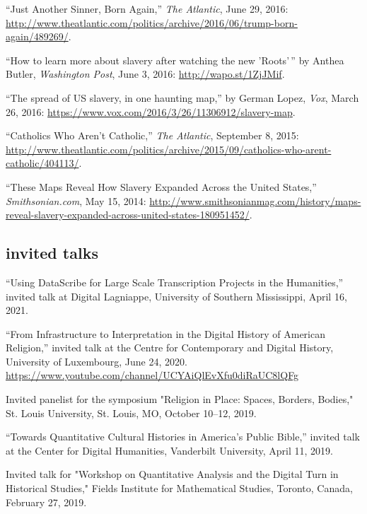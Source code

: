 \documentclass[11pt]{article}
\begin{document}
``Just Another Sinner, Born Again,'' \emph{The Atlantic}, June 29, 2016: 
\url{http://www.theatlantic.com/politics/archive/2016/06/trump-born-again/489269/}.

``How to learn more about slavery after watching the new 'Roots'\,'' by Anthea Butler, \emph{Washington Post}, June 3, 2016: \url{http://wapo.st/1ZjJMif}.

``The spread of US slavery, in one haunting map,'' by German Lopez, 
\emph{Vox}, March 26, 2016: 
\url{https://www.vox.com/2016/3/26/11306912/slavery-map}.

``Catholics Who Aren't Catholic,'' \emph{The Atlantic}, September 8, 
2015:  
\url{http://www.theatlantic.com/politics/archive/2015/09/catholics-who-arent-catholic/404113/}.

``These Maps Reveal How Slavery Expanded Across the United States,''
\emph{Smithsonian.com}, May 15, 2014:
\url{http://www.smithsonianmag.com/history/maps-reveal-slavery-expanded-across-united-states-180951452/}.



\subsection{invited talks}\label{invited-talks}

``Using DataScribe for Large Scale Transcription Projects in the Humanities,'' invited talk at Digital Lagniappe, University of Southern Mississippi, April 16, 2021.

``From Infrastructure to Interpretation in the Digital History of American Religion,'' invited talk at the Centre for Contemporary and Digital History, University of Luxembourg, June 24, 2020. \url{https://www.youtube.com/channel/UCYAiQlEvXfu0diRaUC8lQFg}

Invited panelist for the symposium "Religion in Place: Spaces, Borders, Bodies," St. Louis University, St. Louis, MO, October 10--12, 2019.

``Towards Quantitative Cultural Histories in America's Public Bible,'' invited talk at the Center for Digital Humanities, Vanderbilt University, April 11, 2019.

Invited talk for "Workshop on Quantitative Analysis and the Digital Turn in Historical Studies," Fields Institute for Mathematical Studies, Toronto, Canada, February 27, 2019.
\end{document}
